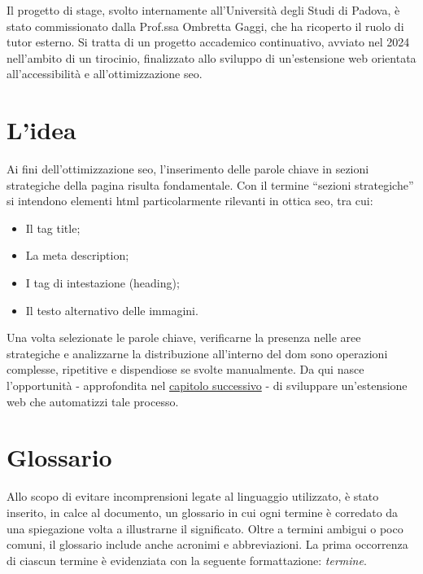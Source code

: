 \par Il progetto di stage, svolto internamente all’Università degli Studi di Padova, è stato commissionato dalla Prof.ssa Ombretta Gaggi, che ha ricoperto il ruolo di tutor esterno. Si tratta di un progetto accademico continuativo, avviato nel 2024 nell’ambito di un tirocinio, finalizzato allo sviluppo di un’estensione web orientata all’accessibilità e all’ottimizzazione \gls{seo}.

\section{L'idea}

\par Ai fini dell’ottimizzazione \gls{seo}, l’inserimento delle parole chiave in sezioni strategiche della pagina risulta fondamentale. Con il termine “sezioni strategiche” si intendono elementi \gls{html} particolarmente rilevanti in ottica \gls{seo}, tra cui:
\begin{itemize}
    \item Il tag title;
    \item La meta description;
    \item I tag di intestazione (heading);
    \item Il testo alternativo delle immagini.
\end{itemize}

\vspace{5pt}
\par\noindent Una volta selezionate le parole chiave, verificarne la presenza nelle aree strategiche e analizzarne la distribuzione all’interno del \gls{dom} sono operazioni complesse, ripetitive e dispendiose se svolte manualmente. Da qui nasce l’opportunità - approfondita nel \hyperref[cap:descrizione-progetto]{capitolo successivo} - di sviluppare un’estensione web che automatizzi tale processo.

\section{Glossario}

\par Allo scopo di evitare incomprensioni legate al linguaggio utilizzato, è stato inserito, in calce al documento, un glossario in cui ogni termine è corredato da una spiegazione volta a illustrarne il significato. Oltre a termini ambigui o poco comuni, il glossario include anche acronimi e abbreviazioni. La prima occorrenza di ciascun termine è evidenziata con la seguente formattazione: \textit{termine}\glsfirstoccur.

